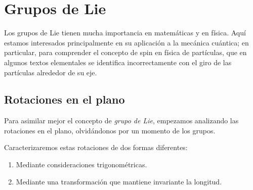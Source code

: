 %

\chapter{Grupos de Lie}
Los grupos de Lie tienen mucha importancia en matemáticas y en física.
Aquí estamos interesados principalmente en su aplicación a la mecánica cuántica; en particular, para comprender el concepto de spin en física de partículas, que en algunos textos elementales se identifica incorrectamente con el giro de las partículas alrededor de su eje.

\section{Rotaciones en el plano}
Para asimilar mejor el concepto de \emph{grupo de Lie}, empezamos analizando las rotaciones en el plano, olvidándonos por un momento de los grupos.

Caracterizaremos estas rotaciones de dos formas diferentes:
\begin{enumerate}
\item Mediante consideraciones trigonométricas.
\item Mediante una transformación que mantiene invariante la longitud.
\end{enumerate}

